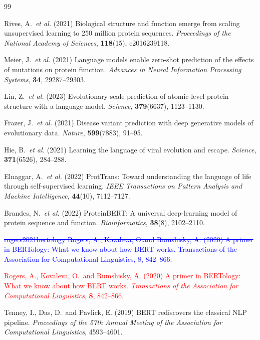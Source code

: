 \documentclass[11pt,a4paper]{article}
\newcommand{\rev}[1]{\textcolor{red}{#1}}
\begin{document}
\newpage
\begin{thebibliography}{99}


Rives, A.\ \textit{et al.} (2021)
Biological structure and function emerge from scaling unsupervised learning to 250
million protein sequences.
\textit{Proceedings of the National Academy of Sciences}, \textbf{118}(15), e2016239118.

Meier, J.\ \textit{et al.} (2021)
Language models enable zero-shot prediction of the effects of mutations on protein
function.
\textit{Advances in Neural Information Processing Systems}, \textbf{34}, 29287--29303.

Lin, Z.\ \textit{et al.} (2023)
Evolutionary-scale prediction of atomic-level protein structure with a language model.
\textit{Science}, \textbf{379}(6637), 1123--1130.

Frazer, J.\ \textit{et al.} (2021)
Disease variant prediction with deep generative models of evolutionary data.
\textit{Nature}, \textbf{599}(7883), 91--95.

Hie, B.\ \textit{et al.} (2021)
Learning the language of viral evolution and escape.
\textit{Science}, \textbf{371}(6526), 284--288.

Elnaggar, A.\ \textit{et al.} (2022)
ProtTrans: Toward understanding the language of life through self-supervised learning.
\textit{IEEE Transactions on Pattern Analysis and Machine Intelligence}, \textbf{44}(10),
7112--7127.

Brandes, N.\ \textit{et al.} (2022)
ProteinBERT: A universal deep-learning model of protein sequence and function.
\textit{Bioinformatics}, \textbf{38}(8), 2102--2110.

\textcolor{blue}{\sout{rogers2021bertology
Rogers, A., Kovaleva, O.and Rumshisky, A. (2020)
A primer in BERTology: What we know about how BERT works.
Transactions of the Association for Computational Linguistics, 8,
842--866.}}

\textcolor{red}{
Rogers, A., Kovaleva, O.\ and Rumshisky, A. (\rev{2020})
A primer in BERTology: What we know about how BERT works.
\textit{Transactions of the Association for Computational Linguistics}, \textbf{8},
842--866.}

Tenney, I., Das, D.\ and Pavlick, E. (2019)
BERT rediscovers the classical NLP pipeline.
\textit{Proceedings of the 57th Annual Meeting of the Association for Computational
Linguistics}, 4593--4601.


\end{thebibliography}
\end{document}
